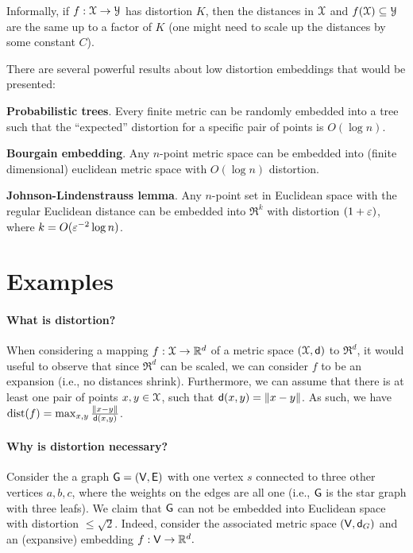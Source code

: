 Informally, if $f:\FMS \to \FMSB$ has distortion $K$, then the
distances in $\FMS$ and $f(\FMS) \subseteq \FMSB$ are the same up to a
factor of $K$ (one might need to scale up the distances by some
constant $C$).



There are several powerful results about low distortion embeddings
that would be presented:
\begin{compactenumI}
    \smallskip%
    \item \textbf{Probabilistic trees}. Every finite metric can be randomly
    embedded into a tree such that the ``expected'' distortion for a
    specific pair of points is $O( \log n)$.

    \smallskip%
    \item \textbf{Bourgain embedding}. Any $n$-point metric space can be
    embedded into (finite dimensional) euclidean metric space with
    $O( \log n )$ distortion.

    \smallskip%
    \item \textbf{Johnson-Lindenstrauss lemma}. Any $n$-point set in
    Euclidean space with the regular Euclidean distance can be
    embedded into $\Re^k$ with distortion $(1+{\varepsilon})$, where
    $k = O({\varepsilon}^{-2} \log n)$.
\end{compactenumI}



\section{Examples} 


\paragraph*{What is distortion?}
When considering a mapping $f:\FMS \rightarrow \Re^d$ of a metric
space $(\FMS, \DistChar)$ to $\Re^d$, it would useful to observe that
since $\Re^d$ can be scaled, we can consider $f$ to be an expansion
(i.e., no distances shrink).  Furthermore, we can assume that there is
at least one pair of points $x, y \in \FMS$, such that
$\mathsf{d}(x,y) = \left\| {x-y} \right\|$. As such, we have
$\mathrm{dist}(f) = \max_{x,y} \frac{\left\| {x - y} \right\|}{\mathsf{d}(x,y)}$.



\paragraph*{Why is distortion necessary?}
Consider the a graph $\mathsf{G}=(\mathsf{V},\mathsf{E})$ with one vertex $s$
connected to three other vertices $a, b, c$, where the weights on the
edges are all one (i.e., $\mathsf{G}$ is the star graph with three leafs).
We claim that $\mathsf{G}$ can not be embedded into Euclidean space with
distortion $\leq \sqrt{2}$.  Indeed, consider the associated metric space
$(\mathsf{V},\mathsf{d}_G)$ and an (expansive) embedding
\begin{math}
    f: \mathsf{V} \rightarrow \mathbb{R}^d.
\end{math}

